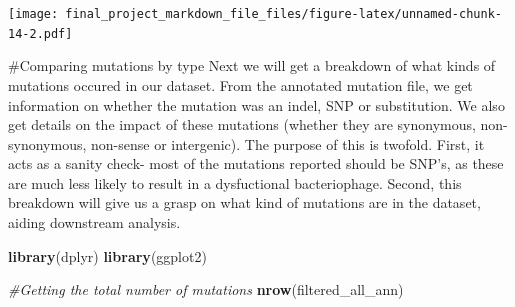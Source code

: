 \documentclass[
]{article}
\newenvironment{Shaded}{\begin{snugshade}}{\end{snugshade}}
\newcommand{\CommentTok}[1]{\textcolor[rgb]{0.56,0.35,0.01}{\textit{#1}}}
\newcommand{\DataTypeTok}[1]{\textcolor[rgb]{0.13,0.29,0.53}{#1}}
\newcommand{\DecValTok}[1]{\textcolor[rgb]{0.00,0.00,0.81}{#1}}
\newcommand{\FloatTok}[1]{\textcolor[rgb]{0.00,0.00,0.81}{#1}}
\newcommand{\KeywordTok}[1]{\textcolor[rgb]{0.13,0.29,0.53}{\textbf{#1}}}
\newcommand{\NormalTok}[1]{#1}
\newcommand{\OperatorTok}[1]{\textcolor[rgb]{0.81,0.36,0.00}{\textbf{#1}}}
\newcommand{\StringTok}[1]{\textcolor[rgb]{0.31,0.60,0.02}{#1}}
\begin{document}
\begin{Shaded}
\end{Shaded}

\texttt{[image: final\_project\_markdown\_file\_files/figure-latex/unnamed-chunk-14-2.pdf]}

\#Comparing mutations by type Next we will get a breakdown of what kinds
of mutations occured in our dataset. From the annotated mutation file,
we get information on whether the mutation was an indel, SNP or
substitution. We also get details on the impact of these mutations
(whether they are synonymous, non-synonymous, non-sense or intergenic).
The purpose of this is twofold. First, it acts as a sanity check- most
of the mutations reported should be SNP's, as these are much less likely
to result in a dysfuctional bacteriophage. Second, this breakdown will
give us a grasp on what kind of mutations are in the dataset, aiding
downstream analysis.

\begin{Shaded}
\begin{Highlighting}[]
\KeywordTok{library}\NormalTok{(dplyr)}
\KeywordTok{library}\NormalTok{(ggplot2)}

\CommentTok{#Getting the total number of mutations}
\KeywordTok{nrow}\NormalTok{(filtered_all_ann)}
\end{Highlighting}
\end{Shaded}
\end{document}
